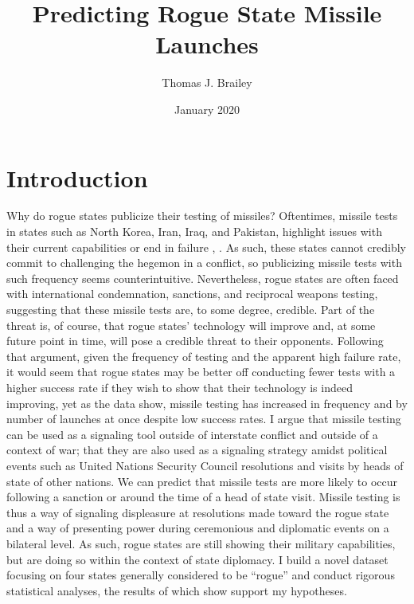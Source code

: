 \documentclass[12pt]{article}
\title{Predicting Rogue State Missile Launches}
\author{Thomas J. Brailey}
\date{January 2020}
\begin{document}
\maketitle

\doublespacing

\section{Introduction}
Why do rogue states publicize their testing of missiles? Oftentimes, missile tests in states such as North Korea, Iran, Iraq, and Pakistan, highlight issues with their current capabilities or end in failure ,  . As such, these states cannot credibly commit to challenging the hegemon in a conflict, so publicizing missile tests with such frequency seems counterintuitive. Nevertheless, rogue states are often faced with international condemnation, sanctions, and reciprocal weapons testing, suggesting that these missile tests are, to some degree, credible. Part of the threat is, of course, that rogue states’ technology will improve and, at some future point in time, will pose a credible threat to their opponents. Following that argument, given the frequency of testing and the apparent high failure rate, it would seem that rogue states may be better off conducting fewer tests with a higher success rate if they wish to show that their technology is indeed improving, yet as the data show, missile testing has increased in frequency and by number of launches at once despite low success rates. I argue that missile testing can be used as a signaling tool outside of interstate conflict and outside of a context of war; that they are also used as a signaling strategy amidst political events such as United Nations Security Council resolutions and visits by heads of state of other nations. We can predict that missile tests are more likely to occur following a sanction or around the time of a head of state visit. Missile testing is thus a way of signaling displeasure at resolutions made toward the rogue state and a way of presenting power during ceremonious and diplomatic events on a bilateral level. As such, rogue states are still showing their military capabilities, but are doing so within the context of state diplomacy. I build a novel dataset focusing on four states generally considered to be “rogue” and conduct rigorous statistical analyses, the results of which show support my hypotheses. 
\end{document}
